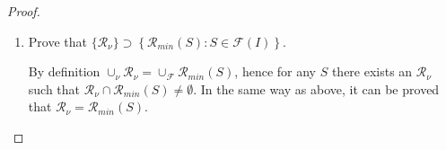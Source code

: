 \documentclass[10pt,a4paper]{amsart}
\begin{document}
\begin{proof}
\begin{enumerate}
        \item Prove that $\{\mathcal{R}_{\nu}\} \supset \left\{ \mathcal{R}_{min}(S):S\in\mathcal{F}(I)\right\} $.

        By definition $\cup_{\nu} \mathcal{R}_{\nu} = \cup_{\mathcal{F}} \mathcal{R}_{min}(S)$, hence for any $S$ there exists an $\mathcal{R}_{\nu}$ such that $\mathcal{R}_{\nu} \cap \mathcal{R}_{min}(S) \neq \emptyset$. In the same way as above, it can be proved that $\mathcal{R}_{\nu}=\mathcal{R}_{min}(S)$.
    \end{enumerate}
\end{proof}
\end{document}
